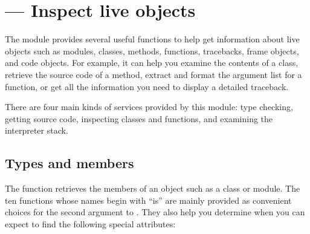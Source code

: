 \section{ ---
         Inspect live objects}



The  module provides several useful functions
to help get information about live objects such as modules,
classes, methods, functions, tracebacks, frame objects, and
code objects.  For example, it can help you examine the
contents of a class, retrieve the source code of a method,
extract and format the argument list for a function, or
get all the information you need to display a detailed traceback.

There are four main kinds of services provided by this module:
type checking, getting source code, inspecting classes
and functions, and examining the interpreter stack.

\subsection{Types and members
            \label{inspect-types}}

The  function retrieves the members
of an object such as a class or module.
The ten functions whose names begin with ``is'' are mainly
provided as convenient choices for the second argument to
.  They also help you determine when
you can expect to find the following special attributes:

